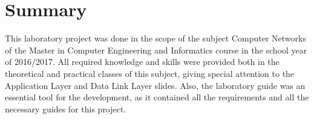 \documentclass[a4paper]{article}
\begin{document}
\maketitle
\thispagestyle{empty}


\newpage

%
%
%
%
%
%
%



\section{Summary}

This laboratory project was done in the scope of the subject Computer Networks of the Master in Computer Engineering and Informatics course in the school year of 2016/2017. All required knowledge and skills were provided both in the theoretical and practical classes of this subject, giving special attention to the Application Layer and Data Link Layer slides. Also, the laboratory guide was an essential tool for the development, as it contained all the requirements and all the necessary guides for this project.
\end{document}
